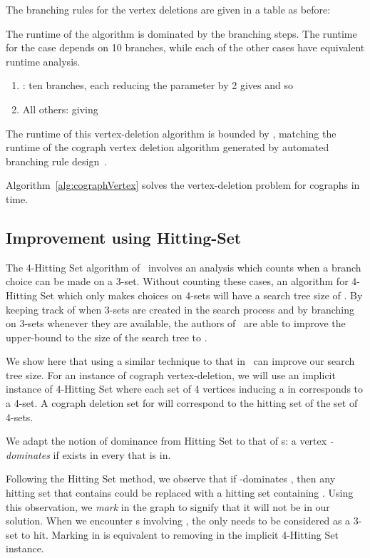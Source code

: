 \documentclass{llncs}
\begin{document}
The branching rules for the vertex deletions are given in a table as before:



The runtime of the algorithm is dominated by the branching steps. The runtime  for the  case depends on 10 branches, while each of the other cases have equivalent runtime analysis.

\begin{enumerate}
  \item : ten branches, each reducing the parameter by 2 gives  and so 
  \item All others:  giving 
\end{enumerate}

The runtime of this vertex-deletion algorithm is bounded by , matching the runtime of the cograph vertex deletion algorithm generated by automated branching rule design~\cite{GGHN}.

\begin{theorem}
    Algorithm~\ref{alg:cographVertex} solves the vertex-deletion problem for cographs in  time.
\end{theorem}

\subsection{Improvement using Hitting-Set}

The 4-{\sc Hitting Set} algorithm of~\cite{NiRo} involves an analysis which counts when a branch choice can be made on a 3-set. Without counting these cases, an algorithm for 4-{\sc Hitting Set} which only makes choices on 4-sets will have a search tree size of . By keeping track of when 3-sets are created in the search process and by branching on 3-sets whenever they are available, the authors of~\cite{NiRo} are able to improve the upper-bound to the size of the search tree to .

We show here that using a similar technique to that in~\cite{NiRo} can improve our search tree size. For an instance  of cograph vertex-deletion, we will use an implicit instance of 4-{\sc Hitting Set} where each set of 4 vertices inducing a  in  corresponds to a 4-set. A cograph deletion set for  will correspond to the hitting set of the set of 4-sets. 

We adapt the notion of dominance from {\sc Hitting Set} to that of s: a vertex  \emph{-dominates}  if  exists in every  that  is in.

Following the {\sc Hitting Set} method, we observe that if  -dominates , then any hitting set that contains  could be replaced with a hitting set containing . Using this observation, we \emph{mark}  in the graph to signify that it will not be in our solution. When we encounter s involving , the  only needs to be considered as a 3-set to hit. Marking  in  is equivalent to removing  in the implicit 4-{\sc Hitting Set} instance.
\end{document}

